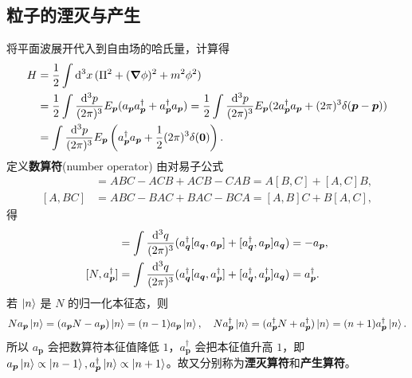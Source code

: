 \subsection{粒子的湮灭与产生}

将平面波展开代入到自由场的哈氏量，计算得
\begin{align}
  H &= \frac 12 \int\dd[3]{x} (\Pi^2 + (\grad\phi)^2 + m^2\phi^2) \notag\\
  &= \frac{1}{2}\int\frac{\dd^3p}{(2\pi)^3}E_{\bm{p}}
     (a_{\bm{p}}a^\dagger_{\bm{p}}+a^\dagger_{\bm{p}}a_{\bm{p}}) = \frac{1}{2}\int\frac{\dd^3p}{(2\pi)^3}E_{\bm{p}}
     (2a^\dagger_{\bm{p}}a_{\bm{p}}+(2\pi)^3\delta(\bm{p}-\bm{p}))\notag\\
  &= \int\frac{\dd^3p}{(2\pi)^3}E_{\bm{p}}
     \left(a^\dagger_{\bm{p}}a_{\bm{p}}+\frac{1}{2}(2\pi)^3\delta(\bm 0)\right).
\end{align}
定义\textbf{数算符}(number operator)
由对易子公式
\begin{align*}
  [AB,C] &= ABC-ACB+ACB-CAB = A[B,C]+[A,C]B,\\
  [A,BC] &= ABC-BAC+BAC-BCA = [A,B]C+B[A,C],
\end{align*}
得
\begin{align}
    [N,a_{\bm p}]
    &
    =\int\frac{\d^3q}{(2\pi)^3}(a^\dagger_{\bm q}[a_{\bm q},a_{\bm p}]+[a^\dagger_{\bm q},a_{\bm p}]a_{\bm q})
    =
    -a_{\bm p},\\
    [N,a^\dagger_{\bm p}]
    &
    =\int\frac{\d^3q}{(2\pi)^3}(
    a^\dagger_{\bm q}[a_{\bm q},a^\dagger_{\bm p}]
    +
    [a^\dagger_{\bm q},a^\dagger_{\bm p}]a_{\bm q})
    =
    a^\dagger_{\bm p}.
\end{align}
若 $\ket n$ 是 $N$ 的归一化本征态，则
\[
    N a_{\bm p}\ket n
    =
    (a_{\bm p}N-a_{\bm p})\ket n
    =
    (n-1)a_{\bm p}\ket n,\quad N a^\dagger_{\bm p}\ket n
    =
    (a^\dagger_{\bm p} N+a^\dagger_{\bm p})\ket n
    =
    (n+1)a^\dagger_{\bm p}\ket n.
\]
所以 $a_{\bm p}$ 会把数算符本征值降低 $1$，$a^\dagger_{\bm p}$ 会把本征值升高 $1$，即 $a_{\bm p}\ket{n}\propto\ket{n-1},a^\dagger_{\bm p}\ket{n}\propto\ket{n+1}$。故又分别称为\textbf{湮灭算符}和\textbf{产生算符}。

